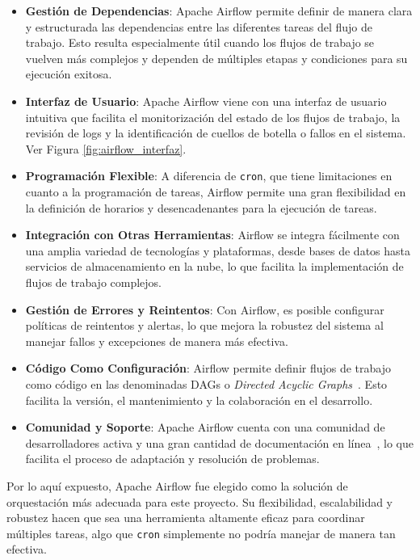 \begin{itemize}
\item \textbf{Gestión de Dependencias}: Apache Airflow permite definir de manera clara y estructurada las dependencias entre las diferentes tareas del flujo de trabajo. Esto resulta especialmente útil cuando los flujos de trabajo se vuelven más complejos y dependen de múltiples etapas y condiciones para su ejecución exitosa.

\item \textbf{Interfaz de Usuario}: Apache Airflow viene con una interfaz de usuario intuitiva que facilita el monitorización del estado de los flujos de trabajo, la revisión de logs y la identificación de cuellos de botella o fallos en el sistema. Ver Figura \ref{fig:airflow_interfaz}.

\item \textbf{Programación Flexible}: A diferencia de \texttt{cron}, que tiene limitaciones en cuanto a la programación de tareas, Airflow permite una gran flexibilidad en la definición de horarios y desencadenantes para la ejecución de tareas.

\item \textbf{Integración con Otras Herramientas}: Airflow se integra fácilmente con una amplia variedad de tecnologías y plataformas, desde bases de datos hasta servicios de almacenamiento en la nube, lo que facilita la implementación de flujos de trabajo complejos.

\item \textbf{Gestión de Errores y Reintentos}: Con Airflow, es posible configurar políticas de reintentos y alertas, lo que mejora la robustez del sistema al manejar fallos y excepciones de manera más efectiva.

\item \textbf{Código Como Configuración}: Airflow permite definir flujos de trabajo como código en las denominadas DAGs o \textit{Directed Acyclic Graphs}~\cite{dags}. Esto facilita la versión, el mantenimiento y la colaboración en el desarrollo.

\item \textbf{Comunidad y Soporte}: Apache Airflow cuenta con una comunidad de desarrolladores activa y una gran cantidad de documentación en línea~\cite{airflow}, lo que facilita el proceso de adaptación y resolución de problemas.
\end{itemize}

Por lo aquí expuesto, Apache Airflow fue elegido como la solución de orquestación más adecuada para este proyecto. Su flexibilidad, escalabilidad y robustez hacen que sea una herramienta altamente eficaz para coordinar múltiples tareas, algo que \texttt{cron} simplemente no podría manejar de manera tan efectiva.

